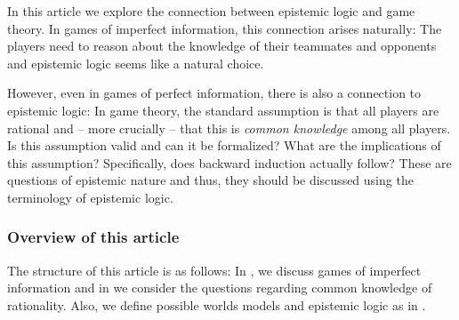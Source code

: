 In this article we explore the connection between epistemic logic and game theory. In games of imperfect information, this connection arises naturally: The players need to reason about the knowledge of their teammates and opponents and epistemic logic seems like a natural choice.

However, even in games of perfect information, there is also a connection to epistemic logic: In game theory, the standard assumption is that all players are rational and -- more crucially -- that this is \emph{common knowledge} among all players. Is this assumption valid and can it be formalized? What are the implications of this assumption? Specifically, does backward induction actually follow? These are questions of epistemic nature and thus, they should be discussed using the terminology of epistemic logic.

\subsubsection*{Overview of this article}

The structure of this article is as follows: In , we discuss games of imperfect information and in  we consider the questions regarding common knowledge of rationality. Also, we define possible worlds models and epistemic logic as in \cite{fagin1995a}.